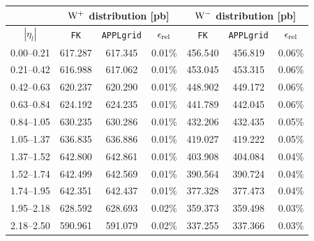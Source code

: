 \begin{table}[ht!]
\begin{center}
\footnotesize
\begin{tabular}{c|c|c|c||c|c|c|}
\cline{2-7}
   & \multicolumn{3}{|c||}{${\rm W}^{+}$ distribution [pb]} & \multicolumn{3}{|c|}{${\rm W}^{-}$ distribution [pb]}  \\
\hline
\multicolumn{1}{|c||}{$| \eta_{l} |$} & {\tt FK}	 & {\tt APPLgrid} &  $\epsilon_{\rm rel}$ & {\tt FK}  &  {\tt APPLgrid} &  $\epsilon_{\rm rel}$\\
\hline
\multicolumn{1}{|c||}{0.00--0.21} & 617.287 & 617.345 & 0.01\% & 456.540 & 456.819 & 0.06\% \\
\multicolumn{1}{|c||}{0.21--0.42} & 616.988 & 617.062 & 0.01\% & 453.045 & 453.315 & 0.06\%\\
\multicolumn{1}{|c||}{0.42--0.63} & 620.237 & 620.290 & 0.01\% & 448.902 & 449.172 & 0.06\%\\
\multicolumn{1}{|c||}{0.63--0.84} & 624.192 & 624.235 & 0.01\% & 441.789 & 442.045 & 0.06\%\\
\multicolumn{1}{|c||}{0.84--1.05} & 630.235 & 630.286 & 0.01\% & 432.206 & 432.435 & 0.05\%\\
\multicolumn{1}{|c||}{1.05--1.37} & 636.835 & 636.886 & 0.01\% & 419.027 & 419.222 & 0.05\%\\
\multicolumn{1}{|c||}{1.37--1.52} & 642.800 & 642.861 & 0.01\% & 403.908 & 404.084 & 0.04\%\\
\multicolumn{1}{|c||}{1.52--1.74} & 642.499 & 642.569 & 0.01\% & 390.564 & 390.724 & 0.04\%\\
\multicolumn{1}{|c||}{1.74--1.95} & 642.351 & 642.437 & 0.01\% & 377.328 & 377.473 & 0.04\%\\ 
\multicolumn{1}{|c||}{1.95--2.18} & 628.592 & 628.693 & 0.02\% & 359.373 & 359.498 & 0.03\%\\
\multicolumn{1}{|c||}{2.18--2.50} & 590.961 & 591.079 & 0.02\% & 337.255 & 337.366 & 0.03\% \\
\hline
 \end{tabular}
 
 \vspace{2mm}
 

\end{center}
\end{table}
